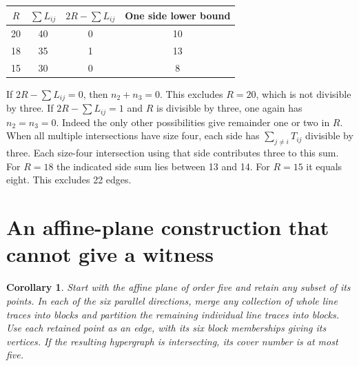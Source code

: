 \documentclass[10pt]{article}
\newtheorem{corollary}{Corollary}
\begin{document}
\begin{center}
\begin{tabular}{c|c|c|c}
$R$ & $\sum L_{ij}$ & $2R-\sum L_{ij}$ & One side lower bound\\
\hline
20 & 40 & 0 & 10\\
18 & 35 & 1 & 13\\
15 & 30 & 0 & 8
\end{tabular}
\end{center}

If $2R-\sum L_{ij}=0$, then $n_2+n_3=0$. This excludes $R=20$,
which is not divisible by three. If $2R-\sum L_{ij}=1$ and $R$ is
divisible by three, one again has $n_2=n_3=0$. Indeed the only
other possibilities give remainder one or two in $R$.
When all multiple intersections have size four, each side has
$\sum_{j\ne i}T_{ij}$ divisible by three. Each size-four
intersection using that side contributes three to this sum.
For $R=18$ the indicated side sum lies between 13 and 14.
For $R=15$ it equals eight. This excludes 22 edges.




\section{An affine-plane construction that cannot give a witness}

\begin{corollary}
Start with the affine plane of order five and retain any subset of its
points. In each of the six parallel directions, merge any collection of
whole line traces into blocks and partition the remaining individual
line traces into blocks. Use each retained point as an edge, with its
six block memberships giving its vertices. If the resulting hypergraph
is intersecting, its cover number is at most five.
\end{corollary}
\end{document}
